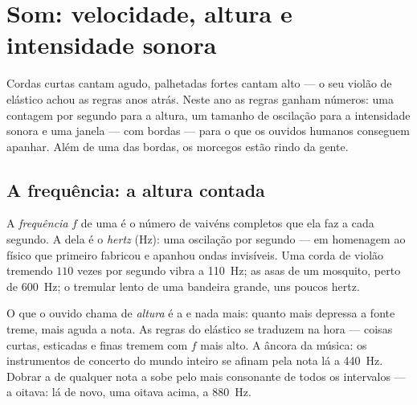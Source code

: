 \chapter{Som: velocidade, altura e intensidade sonora}\label{ch:g8:sound-pitch-loudness}

Cordas curtas cantam agudo, palhetadas fortes cantam alto --- o seu
violão de elástico achou as regras anos atrás. Neste ano as regras
ganham números: uma contagem por segundo para a altura, um tamanho de
oscilação para a intensidade sonora e uma janela --- com bordas ---
para o que os ouvidos humanos conseguem apanhar. Além de uma das
bordas, os morcegos estão rindo da gente.

\section{A frequência: a altura contada}

\begin{definition}[Frequência]\label{def:g8:sound-pitch-loudness:frequency}
A \emph{frequência} $f$ de uma  é o número
de vaivéns completos que ela faz a cada segundo. A  dela é o
\emph{hertz} (\unit{Hz}): uma oscilação por segundo ---
em homenagem ao físico que primeiro fabricou e apanhou ondas
invisíveis. Uma corda de violão tremendo $110$ vezes por segundo vibra
a \qty{110}{Hz}; as asas de um mosquito, perto de \qty{600}{Hz}; o
tremular lento de uma bandeira grande, uns poucos hertz.
\end{definition}

\begin{proposition}\label{prop:g8:sound-pitch-loudness:pitch}
O que o ouvido chama de \emph{altura} é a  e nada mais:
quanto mais depressa a fonte treme, mais aguda a nota. As regras do
elástico se traduzem na hora --- coisas curtas, esticadas e finas
tremem com $f$ mais alto. A âncora da música: os instrumentos de
concerto do mundo inteiro se afinam pela nota lá a \qty{440}{Hz}.
Dobrar a  de qualquer nota a sobe pelo mais consonante de
todos os intervalos --- a oitava: lá de novo, uma oitava acima, a
\qty{880}{Hz}.
\end{proposition}

